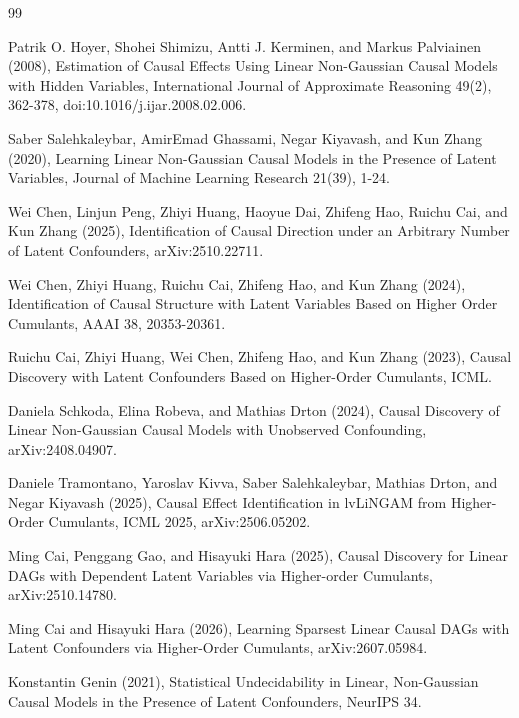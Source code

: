 \documentclass{article}
\begin{document}
\begin{thebibliography}{99}

   Patrik O. Hoyer, Shohei Shimizu, Antti J. Kerminen, and Markus Palviainen (2008), Estimation of Causal Effects Using Linear Non-Gaussian Causal Models with Hidden Variables, International Journal of Approximate Reasoning 49(2), 362-378, doi:10.1016/j.ijar.2008.02.006.

   Saber Salehkaleybar, AmirEmad Ghassami, Negar Kiyavash, and Kun Zhang (2020), Learning Linear Non-Gaussian Causal Models in the Presence of Latent Variables, Journal of Machine Learning Research 21(39), 1-24.

   Wei Chen, Linjun Peng, Zhiyi Huang, Haoyue Dai, Zhifeng Hao, Ruichu Cai, and Kun Zhang (2025), Identification of Causal Direction under an Arbitrary Number of Latent Confounders, arXiv:2510.22711.

   Wei Chen, Zhiyi Huang, Ruichu Cai, Zhifeng Hao, and Kun Zhang (2024), Identification of Causal Structure with Latent Variables Based on Higher Order Cumulants, AAAI 38, 20353-20361.

   Ruichu Cai, Zhiyi Huang, Wei Chen, Zhifeng Hao, and Kun Zhang (2023), Causal Discovery with Latent Confounders Based on Higher-Order Cumulants, ICML.

   Daniela Schkoda, Elina Robeva, and Mathias Drton (2024), Causal Discovery of Linear Non-Gaussian Causal Models with Unobserved Confounding, arXiv:2408.04907.

   Daniele Tramontano, Yaroslav Kivva, Saber Salehkaleybar, Mathias Drton, and Negar Kiyavash (2025), Causal Effect Identification in lvLiNGAM from Higher-Order Cumulants, ICML 2025, arXiv:2506.05202.

   Ming Cai, Penggang Gao, and Hisayuki Hara (2025), Causal Discovery for Linear DAGs with Dependent Latent Variables via Higher-order Cumulants, arXiv:2510.14780.

   Ming Cai and Hisayuki Hara (2026), Learning Sparsest Linear Causal DAGs with Latent Confounders via Higher-Order Cumulants, arXiv:2607.05984.

   Konstantin Genin (2021), Statistical Undecidability in Linear, Non-Gaussian Causal Models in the Presence of Latent Confounders, NeurIPS 34.


\end{thebibliography}
\end{document}
